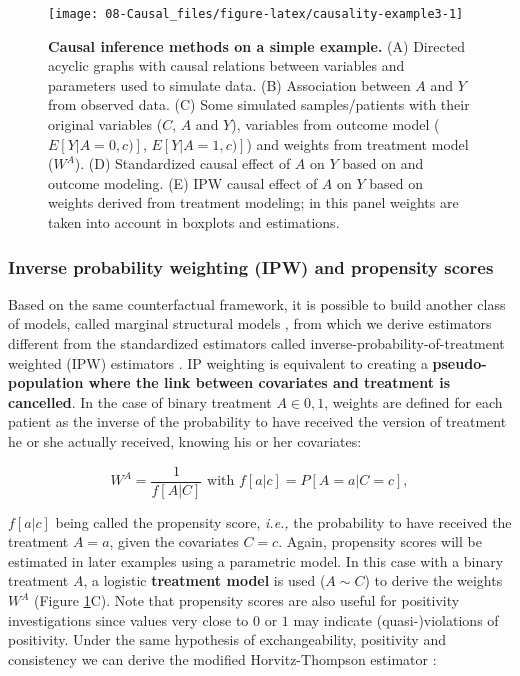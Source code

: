 \documentclass[a4paper,12pt,twoside,onecolumn,openright,final,oldfontcommands]{memoir}
\begin{document}
\begin{figure}

{\centering \texttt{[image: 08-Causal\_files/figure-latex/causality-example3-1]} 

}

\caption[Causal inference methods on a simple example]{\textbf{Causal inference methods on a
simple example.} (A) Directed acyclic graphs with causal relations
between variables and parameters used to simulate data. (B) Association
between \(A\) and \(Y\) from observed data. (C) Some simulated
samples/patients with their original variables (\(C\), \(A\) and \(Y\)),
variables from outcome model (\(E[Y|A=0,c)]\), \(E[Y|A=1,c)]\)) and
weights from treatment model (\(W^A\)). (D) Standardized causal effect
of \(A\) on \(Y\) based on and outcome modeling. (E) IPW causal effect
of \(A\) on \(Y\) based on weights derived from treatment modeling; in
this panel weights are taken into account in boxplots and estimations.}\label{fig:causality-example3}
\end{figure}












\subsubsection{Inverse probability weighting (IPW) and propensity
scores}\label{IPW-classic}

Based on the same counterfactual framework, it is possible to build
another class of models, called marginal structural models
\citep{robins2000marginal}, from which we derive estimators different
from the standardized estimators called inverse-probability-of-treatment
weighted (IPW) estimators \citep{cole2008constructing}. IP weighting is
equivalent to creating a \textbf{pseudo-population where the link
between covariates and treatment is cancelled}. In the case of binary
treatment \(A \in {0 ,1}\), weights are defined for each patient as the
inverse of the probability to have received the version of treatment he
or she actually received, knowing his or her covariates:

\[W^A=\dfrac{1}{f[A|C]} \text{ with } f[a|c]=P[A=a|C=c],\]

\(f[a|c]\) being called the propensity score, \emph{i.e.,} the
probability to have received the treatment \(A=a\), given the covariates
\(C=c\). Again, propensity scores will be estimated in later examples
using a parametric model. In this case with a binary treatment \(A\), a
logistic \textbf{treatment model} is used (\(A\sim C\)) to derive the
weights \(W^A\) (Figure \ref{fig:causality-example3}C). Note that
propensity scores are also useful for positivity investigations since
values very close to \(0\) or \(1\) may indicate (quasi-)violations of
positivity. Under the same hypothesis of exchangeability, positivity and
consistency we can derive the modified Horvitz-Thompson estimator
\citep{horvitz1952generalization, hernan2020causal}:
\end{document}
